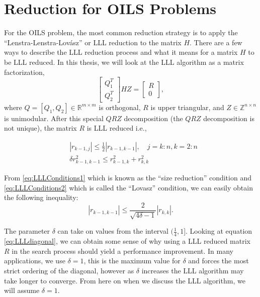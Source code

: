 \documentclass[12pt,Bold,letterpaper]{mcgilletdclass}
\newcommand{\vsp}{\vspace{\baselineskip}}
\begin{document}
\vsp \section{Reduction for OILS Problems} \label{sec:oilsreduction}
For the OILS problem, the most common reduction strategy is to apply the ``Lenstra-Lenstra-Lovász'' or LLL reduction \cite{LenLL82} to the matrix $H$. There are a few ways to describe the LLL reduction process and what it means for a matrix $H$ to be LLL reduced. In this thesis, we will look at the LLL algorithm as a matrix factorization, 
$$\begin{bmatrix}
Q_1^T\\ 
Q_2^T
\end{bmatrix}
HZ = 
\begin{bmatrix}
R\\ 
0
\end{bmatrix},$$
where $Q = [Q_1, Q_2] \in \mathbb{R}^{m \times m} $ is orthogonal, $R$ is upper triangular, and $Z \in \mathbb{Z}^{n \times n}$ is unimodular. After this special $QRZ$ decomposition (the $QRZ$ decomposition is not unique), the matrix $R$ is LLL reduced i.e.,

\begin{align} \label{eq:LLLConditions1}
&\left | r_{k-1,j} \right | \le \frac{1}{2} \left | r_{k-1,k-1} \right |, \quad
j = k:n, k=2:n \\
\label{eq:LLLConditions2}
&\delta r_{k-1,k-1}^2 \le r_{k-1,k}^2 + r_{k,k}^2
\end{align}

From \eqref{eq:LLLConditions1} which is known as the ``size reduction''
condition and \eqref{eq:LLLConditions2} which is called the ``Lovasz''
condition, we can easily obtain the following inequality:
\begin{equation} \label{eq:LLLdiagonal}
\left | r_{k-1,k-1} \right | \le \frac{2}{\sqrt{4\delta -1}}\left | r_{k,k} \right |.
\end{equation}

The parameter $\delta$ can take on values from the interval $(\frac{1}{4}, 1]$. Looking at
equation \eqref{eq:LLLdiagonal}, we can obtain some sense of why using a LLL reduced
matrix $R$ in the search process should yield a performance improvement. In many
applications, we use $\delta=1$, this is the maximum value for $\delta$ and
forces the most strict ordering of the diagonal, however as $\delta$ increases the LLL algorithm may take longer to converge. From here on when we discuss the LLL algorithm, we will assume $\delta = 1$.
\end{document}
